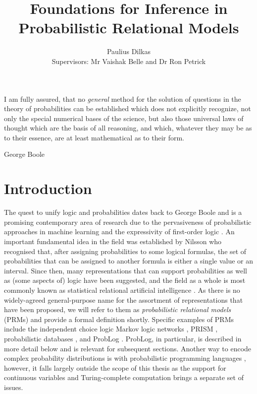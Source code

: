 \documentclass{article}
\title{Foundations for Inference in Probabilistic Relational Models}
\author{Paulius Dilkas \\[1ex] {\small Supervisors: Mr Vaishak Belle and Dr Ron
    Petrick}}
\affil{School of Informatics, University of Edinburgh}
\begin{document}
\maketitle

\epigraph{I am fully assured, that no \emph{general} method for the solution of
  questions in the theory of probabilities can be established which does not
  explicitly recognize, not only the special numerical bases of the science, but
  also those universal laws of thought which are the basis of all reasoning, and
  which, whatever they may be as to their essence, are at least mathematical as
  to their form.}{George Boole \cite{boole1854v}}

\section{Introduction}

The quest to unify logic and probabilities dates back to George Boole
\cite{boole1957laws} and is a promising contemporary area of research due to the
pervasiveness of probabilistic approaches in machine learning and the
expressivity of first-order logic
\cite{DBLP:series/sci/BrazAR08,DBLP:journals/cacm/Russell15}. An important
fundamental idea in the field was established by Nilsson
\cite{DBLP:journals/ai/Nilsson86} who recognised that, after assigning
probabilities to some logical formulas, the set of probabilities that can be
assigned to another formula is either a single value or an interval. Since then,
many representations that can support probabilities as well as (some aspects of)
logic have been suggested, and the field as a whole is most commonly known as
statistical relational artificial intelligence
\cite{DBLP:series/synthesis/2016Raedt}. As there is no widely-agreed
general-purpose name for the assortment of representations that have been
proposed, we will refer to them as \emph{probabilistic relational models} (PRMs)
and provide a formal definition shortly. Specific examples of PRMs include the
independent choice logic \cite{DBLP:journals/ai/Poole97} Markov logic networks
\cite{DBLP:journals/ml/RichardsonD06}, PRISM \cite{DBLP:conf/ijcai/SatoK97},
probabilistic databases \cite{DBLP:series/synthesis/2011Suciu}, and ProbLog
\cite{DBLP:conf/ijcai/RaedtKT07}. ProbLog, in particular, is described in more
detail below and is relevant for subsequent sections. Another way to encode
complex probability distributions is with probabilistic programming languages
\cite{DBLP:conf/icse/GordonHNR14}, however, it falls largely outside the scope
of this thesis as the support for continuous variables and Turing-complete
computation brings a separate set of issues.
\end{document}
